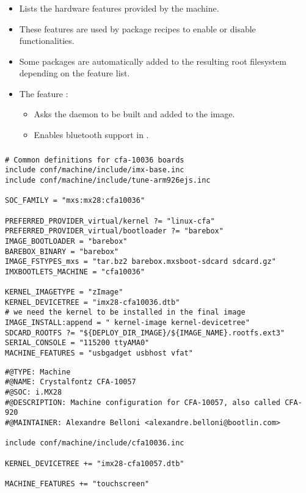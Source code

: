 \begin{frame}
  \frametitle{}
  \begin{itemize}
    \item Lists the hardware features provided by the machine.
    \item These features are used by package recipes to enable or
      disable functionalities.
    \item Some packages are automatically added to the resulting root
    filesystem depending on the feature list.
    \item The feature :
      \begin{itemize}
        \item Asks the  daemon to be built and added to
          the image.
        \item Enables bluetooth support in .
      \end{itemize}
  \end{itemize}
\end{frame}

\begin{frame}[fragile]
  \frametitle{}
  \begin{block}{}
    \begin{verbatim}
# Common definitions for cfa-10036 boards
include conf/machine/include/imx-base.inc
include conf/machine/include/tune-arm926ejs.inc

SOC_FAMILY = "mxs:mx28:cfa10036"

PREFERRED_PROVIDER_virtual/kernel ?= "linux-cfa"
PREFERRED_PROVIDER_virtual/bootloader ?= "barebox"
IMAGE_BOOTLOADER = "barebox"
BAREBOX_BINARY = "barebox"
IMAGE_FSTYPES_mxs = "tar.bz2 barebox.mxsboot-sdcard sdcard.gz"
IMXBOOTLETS_MACHINE = "cfa10036"

KERNEL_IMAGETYPE = "zImage"
KERNEL_DEVICETREE = "imx28-cfa10036.dtb"
# we need the kernel to be installed in the final image
IMAGE_INSTALL:append = " kernel-image kernel-devicetree"
SDCARD_ROOTFS ?= "${DEPLOY_DIR_IMAGE}/${IMAGE_NAME}.rootfs.ext3"
SERIAL_CONSOLE = "115200 ttyAMA0"
MACHINE_FEATURES = "usbgadget usbhost vfat"
    \end{verbatim}
  \end{block}
\end{frame}

\begin{frame}[fragile]{}
  \begin{block}{}
    \begin{verbatim}
#@TYPE: Machine
#@NAME: Crystalfontz CFA-10057
#@SOC: i.MX28
#@DESCRIPTION: Machine configuration for CFA-10057, also called CFA-920
#@MAINTAINER: Alexandre Belloni <alexandre.belloni@bootlin.com>

include conf/machine/include/cfa10036.inc

KERNEL_DEVICETREE += "imx28-cfa10057.dtb"

MACHINE_FEATURES += "touchscreen"
    \end{verbatim}
  \end{block}
\end{frame}

